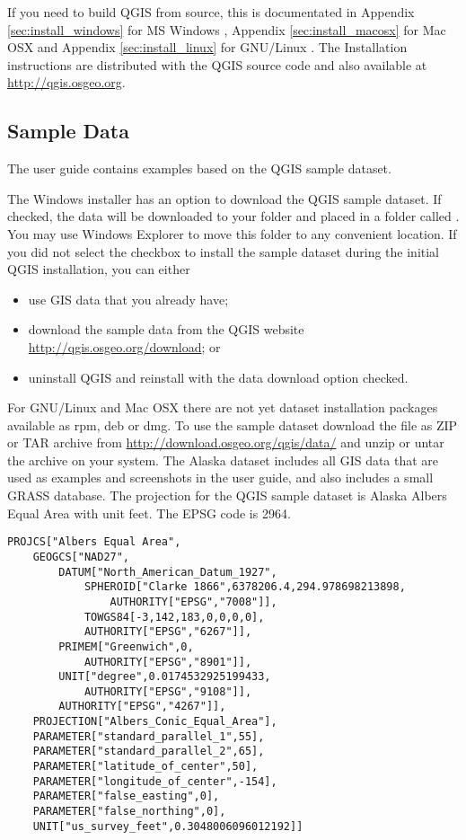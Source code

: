 If you need to build QGIS from source, this is documentated in Appendix
\ref{sec:install_windows} for MS Windows \win, Appendix
\ref{sec:install_macosx} for Mac OSX \osx and Appendix
\ref{sec:install_linux} for GNU/Linux \nix. The Installation instructions are
distributed with the QGIS source code and also available at
\url{http://qgis.osgeo.org}.

\subsection{Sample Data}\label{label_sampledata}

The user guide contains examples based on the QGIS sample dataset. 

\win The Windows installer has an option to download the QGIS sample dataset.
If checked, the data will be downloaded to your 
folder and placed in a folder called . 
You may use Windows Explorer to move this folder to any convenient location.
If you did not select the checkbox to install the sample dataset
during the initial QGIS installation, you can either
\begin{itemize}
\item use GIS data that you already have;
\item download the sample data from the QGIS website
 \url{http://qgis.osgeo.org/download}; or
\item uninstall QGIS and reinstall with the data download option checked.
\end{itemize}

\nix \osx For GNU/Linux and Mac OSX there are not yet dataset installation
packages available as rpm, deb or dmg. To use the sample dataset download the
file  as ZIP or TAR archive from
\url{http://download.osgeo.org/qgis/data/} and unzip or untar the archive on
your system. The Alaska dataset includes all GIS data that are used as
examples and screenshots in the user guide, and also includes a small GRASS
database. The projection for the QGIS sample dataset is Alaska Albers Equal
Area with unit feet. The EPSG code is 2964.

\begin{verbatim}
PROJCS["Albers Equal Area",
    GEOGCS["NAD27",
        DATUM["North_American_Datum_1927",
            SPHEROID["Clarke 1866",6378206.4,294.978698213898,
                AUTHORITY["EPSG","7008"]],
            TOWGS84[-3,142,183,0,0,0,0],
            AUTHORITY["EPSG","6267"]],
        PRIMEM["Greenwich",0,
            AUTHORITY["EPSG","8901"]],
        UNIT["degree",0.0174532925199433,
            AUTHORITY["EPSG","9108"]],
        AUTHORITY["EPSG","4267"]],
    PROJECTION["Albers_Conic_Equal_Area"],
    PARAMETER["standard_parallel_1",55],
    PARAMETER["standard_parallel_2",65],
    PARAMETER["latitude_of_center",50],
    PARAMETER["longitude_of_center",-154],
    PARAMETER["false_easting",0],
    PARAMETER["false_northing",0],
    UNIT["us_survey_feet",0.3048006096012192]]
\end{verbatim}

